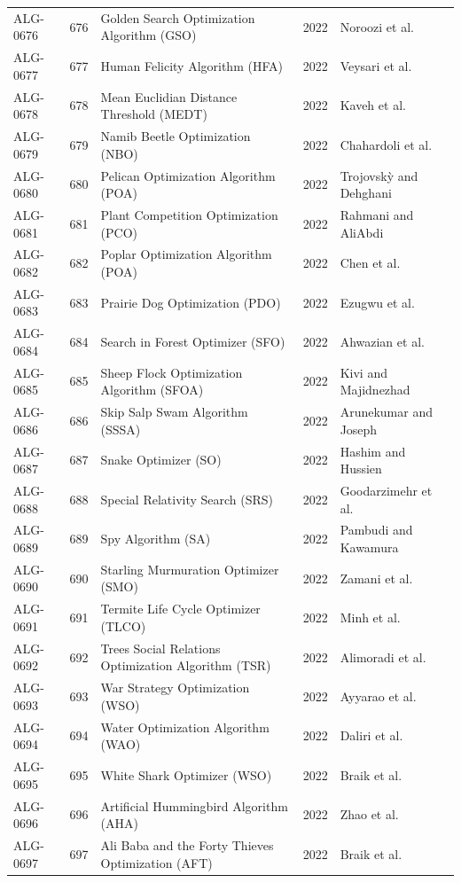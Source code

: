 \documentclass[8pt]{article}
\begin{document}
\begin{landscape}
\begin{longtable}{P{1.7cm}rP{10.0cm}rP{7.2cm}}
ALG-0676 & 676 & Golden Search Optimization Algorithm (GSO) & 2022 & Noroozi et al. \\
ALG-0677 & 677 & Human Felicity Algorithm (HFA) & 2022 & Veysari et al. \\
ALG-0678 & 678 & Mean Euclidian Distance Threshold (MEDT) & 2022 & Kaveh et al. \\
ALG-0679 & 679 & Namib Beetle Optimization (NBO) & 2022 & Chahardoli et al. \\
ALG-0680 & 680 & Pelican Optimization Algorithm (POA) & 2022 & Trojovskỳ and Dehghani \\
ALG-0681 & 681 & Plant Competition Optimization (PCO) & 2022 & Rahmani and AliAbdi \\
ALG-0682 & 682 & Poplar Optimization Algorithm (POA) & 2022 & Chen et al. \\
ALG-0683 & 683 & Prairie Dog Optimization (PDO) & 2022 & Ezugwu et al. \\
ALG-0684 & 684 & Search in Forest Optimizer (SFO) & 2022 & Ahwazian et al. \\
ALG-0685 & 685 & Sheep Flock Optimization Algorithm (SFOA) & 2022 & Kivi and Majidnezhad \\
ALG-0686 & 686 & Skip Salp Swam Algorithm (SSSA) & 2022 & Arunekumar and Joseph \\
ALG-0687 & 687 & Snake Optimizer (SO) & 2022 & Hashim and Hussien \\
ALG-0688 & 688 & Special Relativity Search (SRS) & 2022 & Goodarzimehr et al. \\
ALG-0689 & 689 & Spy Algorithm (SA) & 2022 & Pambudi and Kawamura \\
ALG-0690 & 690 & Starling Murmuration Optimizer (SMO) & 2022 & Zamani et al. \\
ALG-0691 & 691 & Termite Life Cycle Optimizer (TLCO) & 2022 & Minh et al. \\
ALG-0692 & 692 & Trees Social Relations Optimization Algorithm (TSR) & 2022 & Alimoradi et al. \\
ALG-0693 & 693 & War Strategy Optimization (WSO) & 2022 & Ayyarao et al. \\
ALG-0694 & 694 & Water Optimization Algorithm (WAO) & 2022 & Daliri et al. \\
ALG-0695 & 695 & White Shark Optimizer (WSO) & 2022 & Braik et al. \\
ALG-0696 & 696 & Artificial Hummingbird Algorithm (AHA) & 2022 & Zhao et al. \\
ALG-0697 & 697 & Ali Baba and the Forty Thieves Optimization (AFT) & 2022 & Braik et al. \\

\end{longtable}
\end{landscape}
\end{document}
